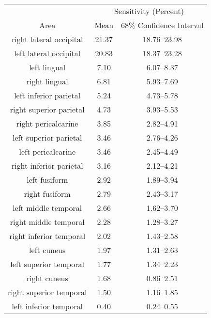 
\begin{tabular}{ccc}
\toprule
& \multicolumn{2}{c}{Sensitivity (Percent)} \\
\cmidrule(l){2-3}
Area & Mean & 68\% Confidence Interval \\
\midrule
right lateral occipital & 21.37 & 18.76--23.98 \\
left lateral occipital & 20.83 & 18.37--23.28 \\
left lingual & 7.10 & 6.07--8.37 \\
right lingual & 6.81 & 5.93--7.69 \\
left inferior parietal & 5.24 & 4.73--5.78 \\
right superior parietal & 4.73 & 3.93--5.53 \\
right pericalcarine & 3.85 & 2.82--4.91 \\
left superior parietal & 3.46 & 2.76--4.26 \\
left pericalcarine & 3.46 & 2.45--4.49 \\
right inferior parietal & 3.16 & 2.12--4.21 \\
left fusiform & 2.92 & 1.89--3.94 \\
right fusiform & 2.79 & 2.43--3.17 \\
left middle temporal & 2.66 & 1.62--3.70 \\
right middle temporal & 2.28 & 1.28--3.27 \\
right inferior temporal & 2.02 & 1.43--2.58 \\
left cuneus & 1.97 & 1.31--2.63 \\
left superior temporal & 1.77 & 1.34--2.23 \\
right cuneus & 1.68 & 0.86--2.51 \\
right superior temporal & 1.50 & 1.16--1.85 \\
left inferior temporal & 0.40 & 0.24--0.55 \\
\bottomrule
\end{tabular}
